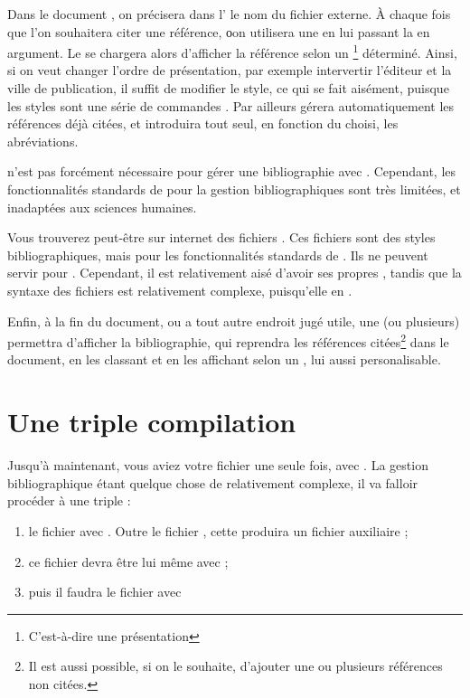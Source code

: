 Dans le document \logiciel{\LaTex}, on précisera dans l' le nom du fichier externe. À chaque fois que l'on souhaitera citer une référence, οon utilisera une  en lui passant la  en argument. Le   se chargera alors d'afficher la référence selon un \footnote{C’est-à-dire une présentation} déterminé. Ainsi, si on veut changer l'ordre de présentation, par exemple intervertir l'éditeur et la ville de publication, il suffit de modifier le style, ce qui se fait aisément, puisque les styles sont une série de commandes \logiciel{\latex}. Par ailleurs  gérera automatiquement les références déjà citées, et introduira tout seul, en fonction du  choisi, les abréviations. 

\begin{anedocte}
 n'est pas forcément nécessaire pour gérer une bibliographie avec \logiciel{\LaTeX}. Cependant, les fonctionnalités standards de  pour la gestion bibliographiques sont très limitées, et inadaptées aux sciences humaines. 

Vous trouverez peut-être sur internet des fichiers . Ces fichiers sont des styles bibliographiques, mais pour les fonctionnalités standards de \logiciel{\LaTex}. Ils ne peuvent servir pour . Cependant, il est relativement aisé d'avoir ses propres , tandis que la syntaxe des fichiers  est relativement complexe, puisqu'elle en .
\end{anedocte}

Enfin, à la fin du document, ou a tout autre endroit jugé utile, une (ou plusieurs)  permettra d'afficher la bibliographie, qui reprendra les références citées\footnote{Il est aussi possible, si on le souhaite, d'ajouter une ou plusieurs références non citées.} dans le document, en les classant et en les affichant selon un , lui aussi personalisable.

\section{Une triple compilation}

Jusqu'à maintenant, vous aviez  votre fichier  une seule fois, avec . La gestion bibliographique étant quelque chose de relativement complexe, il va falloir procéder à une triple  :
\begin{enumerate}
\item le fichier  avec . Outre le fichier , cette  produira un fichier auxiliaire  ;
\item ce fichier devra être lui même  avec  ;
\item puis il faudra  le fichier  avec 
\end{enumerate}

